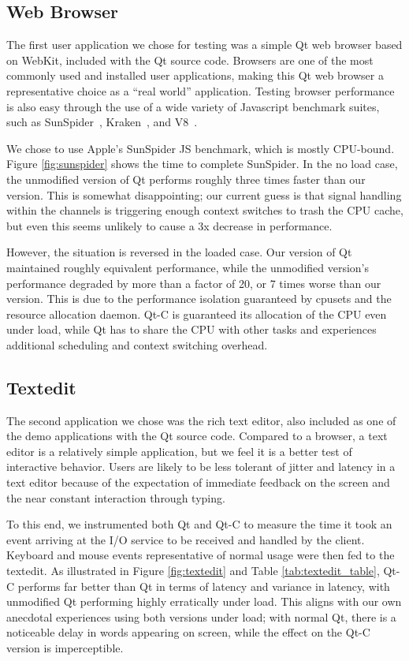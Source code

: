 \documentclass[letterpaper,twocolumn,11pt]{article}
\begin{document}
\subsection{Web Browser}

The first user application we chose for testing was a simple Qt web browser based on WebKit, included with the Qt source code. Browsers are one of the most commonly used and installed user applications, making this Qt web browser a representative choice as a ``real world'' application. Testing browser performance is also easy through the use of a wide variety of Javascript benchmark suites, such as SunSpider~\cite{sunspider}, Kraken~\cite{kraken}, and V8~\cite{v8benchmark}.

We chose to use Apple's SunSpider JS benchmark, which is mostly CPU-bound. Figure \ref{fig:sunspider} shows the time to complete SunSpider. In the no load case, the unmodified version of Qt performs roughly three times faster than our version. This is somewhat disappointing; our current guess is that signal handling within the channels is triggering enough context switches to trash the CPU cache, but even this seems unlikely to cause a 3x decrease in performance.

However, the situation is reversed in the loaded case. Our version of Qt maintained roughly equivalent performance, while the unmodified version's performance degraded by more than a factor of 20, or 7 times worse than our version. This is due to the performance isolation guaranteed by cpusets and the resource allocation daemon. Qt-C is guaranteed its allocation of the CPU even under load, while Qt has to share the CPU with other tasks and experiences additional scheduling and context switching overhead.

\subsection{Textedit}

The second application we chose was the rich text editor, also included as one of the demo applications with the Qt source code. Compared to a browser, a text editor is a relatively simple application, but we feel it is a better test of interactive behavior. Users are likely to be less tolerant of jitter and latency in a text editor because of the expectation of immediate feedback on the screen and the near constant interaction through typing. 

To this end, we instrumented both Qt and Qt-C to measure the time it took an event arriving at the I/O service to be received and handled by the client. Keyboard and mouse events representative of normal usage were then fed to the textedit. As illustrated in Figure \ref{fig:textedit} and Table \ref{tab:textedit_table}, Qt-C performs far better than Qt in terms of latency and variance in latency, with unmodified Qt performing highly erratically under load. This aligns with our own anecdotal experiences using both versions under load; with normal Qt, there is a noticeable delay in words appearing on screen, while the effect on the Qt-C version is imperceptible.
\end{document}
